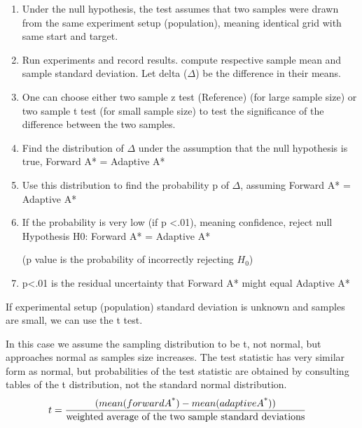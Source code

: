 \documentclass[12pt]{article}
\begin{document}
\begin{enumerate}
   \item
	 \begin {flushleft}
	 Under the null hypothesis, the test assumes that two samples were drawn from the same experiment setup (population), meaning identical grid with same start and target.
	 \end{flushleft}
   \item
	 \begin {flushleft}
	 Run experiments and record results. compute respective sample mean and sample standard deviation. Let delta ($\Delta$) be the difference in their means. 
	 \end{flushleft}
    \item
	 \begin {flushleft}
	 One can choose either two sample z test (Reference) (for large sample size) or two sample t test (for small sample size) to test the significance of the difference between the two samples.
	  \end{flushleft}
	\item
	 \begin {flushleft}
Find the distribution of $\Delta$ under the assumption that the null hypothesis is true, 
Forward A* = Adaptive A*
	 \end{flushleft}
   \item
	 \begin {flushleft}
Use this distribution to find the probability p of $\Delta$, assuming Forward A* = Adaptive A*
	 \end{flushleft}
   \item
	 \begin {flushleft}
	 If the probability is very low (if p <.01), meaning  confidence,	  
reject null Hypothesis H0: Forward A* = Adaptive A*

(p value is the probability of incorrectly rejecting $H_0$)
	 \end{flushleft}
   \item
	 \begin {flushleft}
	 p<.01 is the residual uncertainty that Forward A* might equal Adaptive A*
	 \end{flushleft}
  \end{enumerate}
  If experimental setup (population) standard deviation is unknown and samples are small, we can use the t test.
  
In this case we assume the sampling distribution to be t, not normal, but approaches normal as samples size increases. The test statistic has very similar form as normal, but probabilities of the test statistic are obtained by consulting tables of the t distribution, not the standard normal distribution.
  \hspace {4em}
  \begin{align*}
  	t&=\frac{(mean(forward A\textsuperscript{*}) - mean(adaptive A\textsuperscript{*}))}{\text{weighted  average of the two sample standard deviations}}
  \end{align*}
\end{document}
